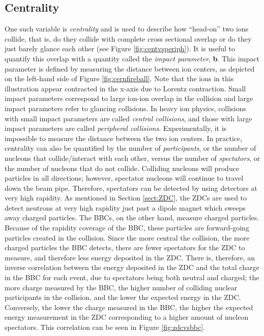 \subsection{Centrality} \label{sect:centrality}
One such variable is \textit{centrality} and is used to describe how ``head-on'' two ions collide, that is, do they collide with complete cross sectional overlap or do they just barely glance each other (see Figure \ref{fig:centvsperiph}). It is useful to quantify this overlap with a quantity called the \textit{impact parameter}, \textbf{b}. This impact parameter is defined by measuring the distance between ion centers, as depicted on the left-hand side of Figure \ref{fig:cernfireball}. Note that the ions in this illustration appear contracted in the x-axis due to Lorentz contraction. Small impact parameters correspond to large ion-ion overlap in the collision and large impact parameters refer to glancing collisions. In heavy ion physics, collisions with small impact parameters are called \textit{central collisions}, and those with large impact parameters are called \textit{peripheral collisions}. Experimentally, it is impossible to measure the distance between the two ion centers. In practice, centrality can also be quantified by the number of \textit{participants}, or the number of nucleons that collide/interact with each other, versus the number of \textit{spectators}, or the number of nucleons that do not collide. Colliding nucleons will produce particles in all directions; however, spectator nucleons will continue to travel down the beam pipe. Therefore, spectators can be detected by using detectors at very high rapidity. As mentioned in Section \ref{sect:ZDC}, the ZDCs are used to detect neutrons at very high rapidity just past a dipole magnet which sweeps away charged particles. The BBCs, on the other hand, measure charged particles. Because of the rapidity coverage of the BBC, these particles are forward-going particles created in the collision. Since the more central the collision, the more charged particles the BBC detects, there are fewer spectators for the ZDC to measure, and therefore less energy deposited in the ZDC. There is, therefore, an inverse correlation between the energy deposited in the ZDC and the total charge in the BBC for each event, due to spectators being both neutral and charged; the more charge measured by the BBC, the higher number of colliding nuclear participants in the collision, and the lower the expected energy in the ZDC. Conversely, the lower the charge measured in the BBC, the higher the expected energy measurement in the ZDC corresponding to a higher amount of nucleon spectators. This correlation can be seen in Figure \ref{fig:zdcvsbbc}.

